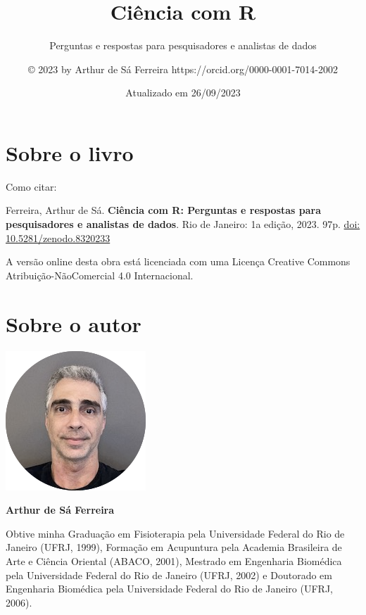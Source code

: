 \documentclass[
]{book}
\title{\textbf{Ciência com R}}
\subtitle{Perguntas e respostas para pesquisadores e analistas de dados}
\author{© 2023 by Arthur de Sá Ferreira https://orcid.org/0000-0001-7014-2002}
\date{Atualizado em 26/09/2023}
\begin{document}
\maketitle


\newpage

{
\setcounter{tocdepth}{1}
\tableofcontents
}
\hypertarget{sobre-o-livro}{%
\chapter*{Sobre o livro}\label{sobre-o-livro}}

Como citar:

Ferreira, Arthur de Sá. \textbf{Ciência com R: Perguntas e respostas para pesquisadores e analistas de dados}. Rio de Janeiro: 1a edição, 2023. 97p. \href{https://zenodo.org/badge/latestdoi/685181979}{doi: 10.5281/zenodo.8320233}

A versão online desta obra está licenciada com uma Licença Creative Commons Atribuição-NãoComercial 4.0 Internacional.

\hypertarget{sobre-o-autor}{%
\chapter*{Sobre o autor}\label{sobre-o-autor}}

\includegraphics{ASF.png}

\textbf{Arthur de Sá Ferreira}

Obtive minha Graduação em Fisioterapia pela Universidade Federal do Rio de Janeiro (UFRJ, 1999), Formação em Acupuntura pela Academia Brasileira de Arte e Ciência Oriental (ABACO, 2001), Mestrado em Engenharia Biomédica pela Universidade Federal do Rio de Janeiro (UFRJ, 2002) e Doutorado em Engenharia Biomédica pela Universidade Federal do Rio de Janeiro (UFRJ, 2006).
\end{document}

